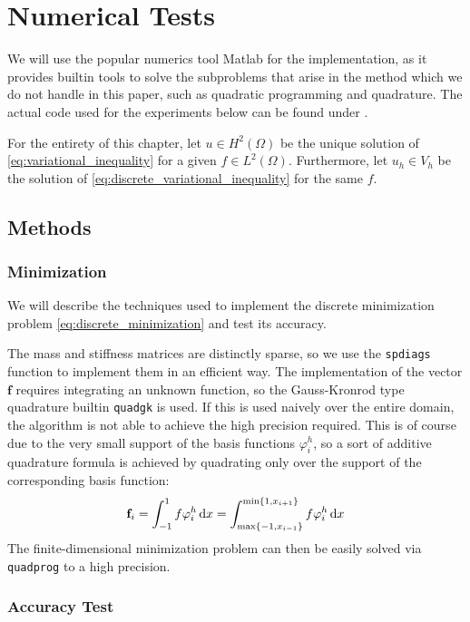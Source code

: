 \documentclass[headsepline,footsepline,footinclude=false,oneside,fontsize=11pt,paper=a4,listof=totoc,bibliography=totoc]{scrbook} %
\begin{document}
\chapter{Numerical Tests}
We will use the popular numerics tool Matlab \cite{MATLAB2020} for the implementation, as it provides builtin tools to solve the subproblems that arise in the method which we do not handle in this paper, such as quadratic programming and quadrature. The actual code used for the experiments below can be found under \cite{Loewenberg2020}.

For the entirety of this chapter, let $u \in H^2(\Omega)$ be the unique solution of \eqref{eq:variational_inequality} for a given $f \in L^2(\Omega)$. Furthermore, let $u_h \in V_h$ be the solution of \eqref{eq:discrete_variational_inequality} for the same $f$.

\section{Methods}
\subsection{Minimization}
We will describe the techniques used to implement the discrete minimization problem \eqref{eq:discrete_minimization} and test its accuracy.

The mass and stiffness matrices are distinctly sparse, so we use the \verb|spdiags| function to implement them in an efficient way. 
The implementation of the vector $\mathbf{f}$ requires integrating an unknown function, so the Gauss-Kronrod type quadrature builtin \verb|quadgk| is used. If this is used naively over the entire domain, the algorithm is not able to achieve the high precision required. This is of course due to the very small support of the basis functions $\varphi_i^h$, so a sort of additive quadrature formula is achieved by quadrating only over the support of the corresponding basis function:
\begin{equation}
\mathbf{f}_i = \int_{-1}^1 f\varphi_i^h\dif x = \int_{\max\{-1, x_{i-1}\}}^{\min\{1, x_{i+1}\}} f\varphi_i^h\dif x
\end{equation} 
The finite-dimensional minimization problem can then be easily solved via \verb|quadprog| to a high precision.

\subsection{Accuracy Test}
\end{document}
